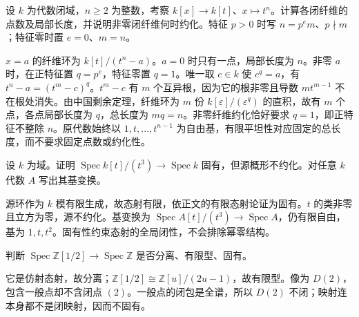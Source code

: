 \begin{optionalexercise}\label{b3:ex:24-ramified-fibers}
	设 \(k\) 为代数闭域，\(n\ge2\) 为整数，考察 \(k[x]\to k[t]\)、\(x\mapsto t^n\)。计算各闭纤维的点数及局部长度，并说明非零闭纤维何时约化。特征 \(p>0\) 时写 \(n=p^e m\)、\(p\nmid m\)；特征零时置 \(e=0\)、\(m=n\)。
\end{optionalexercise}
\begin{solution}
	\(x=a\) 的纤维环为 \(k[t]/(t^n-a)\)。\(a=0\) 时只有一点，局部长度为 \(n\)。非零 \(a\) 时，在正特征置 \(q=p^e\)，特征零置 \(q=1\)。唯一取 \(c\in k\) 使 \(c^q=a\)，有 \(t^n-a=(t^m-c)^q\)。\(t^m-c\) 有 \(m\) 个互异根，因为它的根非零且导数 \(mt^{m-1}\) 不在根处消失。由中国剩余定理，纤维环为 \(m\) 份 \(k[\varepsilon]/(\varepsilon^q)\) 的直积，故有 \(m\) 个点，各点局部长度为 \(q\)，总长度为 \(mq=n\)。非零纤维约化恰好要求 \(q=1\)，即正特征不整除 \(n\)。原代数始终以 \(1,t,\ldots,t^{n-1}\) 为自由基，有限平坦性对应固定的总长度，而不要求固定点数或约化性。
\end{solution}

\begin{optionalexercise}\label{b3:ex:24-finite-proper-not-reduced}
	设 \(k\) 为域。证明 \(\operatorname{Spec}k[t]/(t^3)\rightarrow\operatorname{Spec}k\) 固有，但源概形不约化。对任意 \(k\) 代数 \(A\) 写出其基变换。
\end{optionalexercise}
\begin{solution}
	源环作为 \(k\) 模有限生成，故态射有限，依正文的有限态射论证为固有。\(t\) 的类非零且立方为零，源不约化。基变换为 \(\operatorname{Spec}A[t]/(t^3)\rightarrow\operatorname{Spec}A\)，仍有限自由，基为 \(1,t,t^2\)。固有性约束态射的全局闭性，不会排除幂零结构。
\end{solution}

\begin{optionalexercise}\label{b3:ex:24-localization-not-proper}
	判断 \(\operatorname{Spec}\mathbb Z[1/2]\rightarrow\operatorname{Spec}\mathbb Z\) 是否分离、有限型、固有。
\end{optionalexercise}
\begin{solution}
	它是仿射态射，故分离；\(\mathbb Z[1/2]\cong\mathbb Z[u]/(2u-1)\)，故有限型。像为 \(D(2)\)，包含一般点却不含闭点 \((2)\)。一般点的闭包是全谱，所以 \(D(2)\) 不闭；映射连本身都不是闭映射，因而不固有。
\end{solution}

